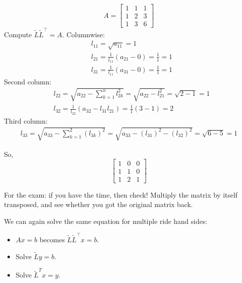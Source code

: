 \begin{example}
    \[ 
        A = \begin{bmatrix}
            1 & 1 & 1\\
            1 & 2 & 3\\
            1 & 3 & 6
        \end{bmatrix}
    \]
    Compute $\tilde{L} \tilde{L}^\intercal = A$.
    Columnwise:
    \begin{align*}
        &
        l_{11} = \sqrt{a_{11}} = 1
        \\&
        l_{21} = \frac{1}{l_{11}} (a_{21} - 0) = \frac{1}{1} = 1
        \\&
        l_{31} = \frac{1}{l_{11}} (a_{31} - 0) = \frac{1}{1} = 1
    \end{align*}
    Second column:
    \begin{align*}
        &
        l_{22} = \sqrt{a_{22} - \sum_{k=1}^n l_{2k}^2} =
        \sqrt{a_{22} - l^2_{21}} = \sqrt{2 - 1} = 1
        \\&
        l_{32} = \frac{1}{l_{22}}(a_{32} - l_{31} l_{21}) = \frac{1}{1} (3 - 1) = 2
    \end{align*}
    Third column:
    \begin{align*}
        l_{33} = \sqrt{a_{33} - \sum_{k=1}^2 (l_{3k})^2} = 
        \sqrt{a_{33} - (l_{31})^2 - (l_{32})^2} = 
        \sqrt{6 - 5} = 1
    \end{align*}

    So,
    \[ 
        \begin{bmatrix}
            1 & 0 & 0\\
            1 & 1 & 0\\
            1 & 2 & 1
        \end{bmatrix}
    \]
\end{example}
\begin{remark}
    For the exam: if you have the time, then check! Multiply the matrix by itself
    transposed, and see whether you got the original matrix back.
\end{remark}

We can again solve the same equation for multiple ride hand sides:
\begin{itemize}
    \item {
        $Ax = b$ becomes $\tilde{L} \tilde{L}^\intercal x = b$.
    }
    \item {
        Solve $\tilde{L} y = b$.
    }
    \item {
        Solve $\tilde{L}^T x = y$.
    }
\end{itemize}

